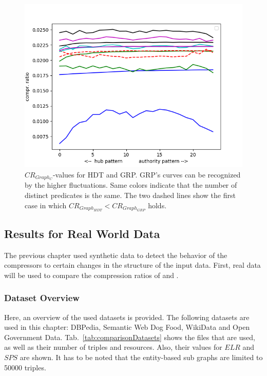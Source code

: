 \begin{figure}
	\centering
	\includegraphics[width=0.8\linewidth]{figures/GRPvsHDT/bothWithoutDictIncreasingPreds}
	\caption{$CR_{Graph_C}$-values for HDT and GRP. GRP's curves can be recognized by the higher fluctuations. Same colors indicate that the number of distinct predicates is the same. The two dashed lines show the first case in which $CR_{Graph_{HDT}} <CR_{Graph_{GRP}} $ holds.} 
	\label{fig:bothwithoutdictincreasingpreds}
\end{figure}



\subsection{Results for Real World Data}

The previous chapter used synthetic data to detect the behavior of the compressors to certain changes in the structure of the input data. First, real data will be used to compare the compression ratios of \GHDT{} and \GGRP{}. 

\subsubsection{Dataset Overview}

Here, an overview of the used datasets is provided. The following datasets are used in this chapter: DBPedia, Semantic Web Dog Food, WikiData and Open Government Data. Tab.~\ref{tab:comparisonDatasets} shows the files that are used, as well as their number of triples and resources. Also, their values for $ELR$ and $SPS$ are shown. It has to be noted that the entity-based sub graphs are limited to 50000 triples.

